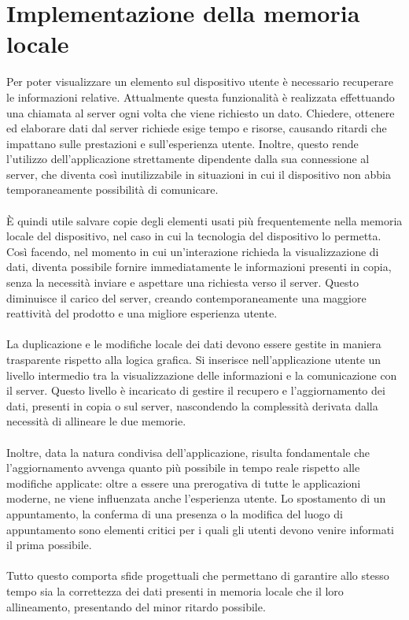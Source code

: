 
\section{Implementazione della memoria locale}

Per poter visualizzare un elemento sul dispositivo utente
è necessario recuperare le informazioni relative.
Attualmente questa funzionalità è realizzata effettuando una chiamata al server
ogni volta che viene richiesto un dato.
Chiedere, ottenere ed elaborare dati dal server
richiede esige tempo e risorse,
causando ritardi che impattano sulle prestazioni e sull'esperienza utente.
Inoltre,
questo rende l'utilizzo dell'applicazione strettamente dipendente dalla sua connessione al server,
che diventa così inutilizzabile in situazioni in cui
il dispositivo non abbia temporaneamente possibilità di comunicare.\\
\\
È quindi utile salvare copie degli elementi usati più frequentemente 
nella memoria locale del dispositivo,
nel caso in cui la tecnologia del dispositivo lo permetta.
Così facendo,
nel momento in cui un'interazione richieda la visualizzazione di dati, 
diventa possibile fornire immediatamente le informazioni presenti in copia, 
senza la necessità inviare e aspettare una richiesta verso il server.
Questo diminuisce il carico del server, 
creando contemporaneamente una maggiore reattività del prodotto
e una migliore esperienza utente.\\
\\
La duplicazione e le modifiche locale dei dati devono essere gestite
in maniera trasparente rispetto alla logica grafica.
Si inserisce nell'applicazione utente un livello intermedio tra 
la visualizzazione delle informazioni e la comunicazione con il server.
Questo livello è incaricato di gestire il recupero e l'aggiornamento dei dati,
presenti in copia o sul server, 
nascondendo la complessità derivata dalla necessità di allineare le due memorie.\\
\\
Inoltre, data la natura condivisa dell'applicazione,
risulta fondamentale che l'aggiornamento avvenga 
quanto più possibile in tempo reale rispetto alle modifiche applicate:
oltre a essere una prerogativa di tutte le applicazioni moderne, 
ne viene influenzata anche l'esperienza utente. 
Lo spostamento di un appuntamento, 
la conferma di una presenza o la modifica del luogo di appuntamento 
sono elementi critici per i quali gli utenti devono venire informati il prima possibile. \\
\\
Tutto questo comporta sfide progettuali che permettano di garantire allo stesso tempo 
sia la correttezza dei dati presenti in memoria locale che il loro allineamento,
presentando del minor ritardo possibile.
\clearpage
